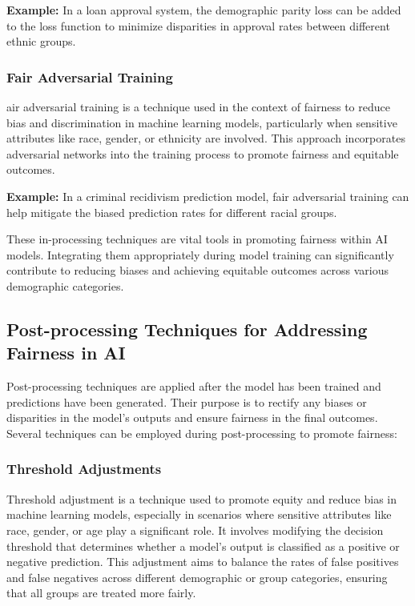 \documentclass[12pt,a4paper,openright,twoside]{book}
\begin{document}
\textbf{Example:} In a loan approval system, the demographic parity loss can be added to the loss function to minimize disparities in approval rates between different ethnic groups.

\subsubsection{Fair Adversarial Training}
air adversarial training is a technique used in the context of fairness to reduce bias and discrimination in machine learning models, particularly when sensitive attributes like race, gender, or ethnicity are involved. This approach incorporates adversarial networks into the training process to promote fairness and equitable outcomes. \cite{pmlr-v139-xu21b}

\textbf{Example:} In a criminal recidivism prediction model, fair adversarial training can help mitigate the biased prediction rates for different racial groups.

These in-processing techniques are vital tools in promoting fairness within AI models. Integrating them appropriately during model training can significantly contribute to reducing biases and achieving equitable outcomes across various demographic categories.

\subsection{Post-processing Techniques for Addressing Fairness in AI}

Post-processing techniques are applied after the model has been trained and predictions have been generated. Their purpose is to rectify any biases or disparities in the model's outputs and ensure fairness in the final outcomes. Several techniques can be employed during post-processing to promote fairness:

\subsubsection{Threshold Adjustments}
Threshold adjustment is a technique used to promote equity and reduce bias in machine learning models, especially in scenarios where sensitive attributes like race, gender, or age play a significant role. It involves modifying the decision threshold that determines whether a model's output is classified as a positive or negative prediction. This adjustment aims to balance the rates of false positives and false negatives across different demographic or group categories, ensuring that all groups are treated more fairly. \cite{10.1145/3447548.3467251}
\end{document}
